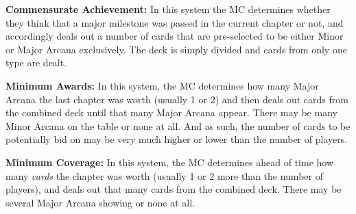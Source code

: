 \textbf{Commensurate Achievement:} In this system the MC determines whether they think that a major milestone was passed in the current chapter or not, and accordingly deals out a number of cards that are pre-selected to be either Minor or Major Arcana exclusively. The deck is simply divided and cards from only one type are dealt.

\textbf{Minimum Awards:} In this system, the MC determines how many Major Arcana the last chapter was worth (usually 1 or 2) and then deals out cards from the combined deck until that many Major Arcana appear. There may be many Minor Arcana on the table or none at all. And as such, the number of cards to be potentially bid on may be very much higher or lower than the number of players.

\textbf{Minimum Coverage:} In this system, the MC determines ahead of time how many \textit{cards} the chapter was worth (usually 1 or 2 more than the number of players), and deals out that many cards from the combined deck. There may be several Major Arcana showing or none at all.
